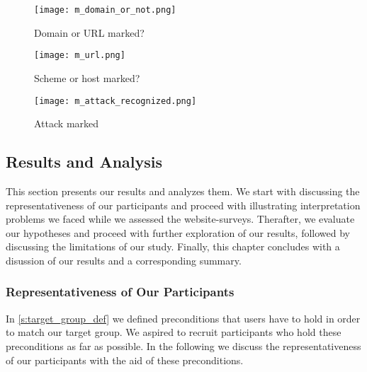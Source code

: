 \begin{figure}[H]
\centering
\texttt{[image: m\_domain\_or\_not.png]}
\caption{Domain or URL marked?}
\label{fig:m_domain_or_not}
\end{figure}

\begin{figure}[H]
\centering
\texttt{[image: m\_url.png]}
\caption{Scheme or host marked?}
\label{fig:m_url}
\end{figure}

\begin{figure}[H]
\centering
\texttt{[image: m\_attack\_recognized.png]}
\caption{Attack marked}
\label{fig:m_attack_recognized}
\end{figure}

\subsection{Results and Analysis}
This section presents our results and analyzes them. 
We start with discussing the representativeness of our participants and proceed with illustrating interpretation problems we faced while we assessed the website-surveys.
Therafter, we evaluate our hypotheses and proceed with further exploration of our results, followed by discussing the limitations of our study.
Finally, this chapter concludes with a disussion of our results and a corresponding summary. 
\subsubsection{Representativeness of Our Participants}
\label{s:representativeness}
In \autoref{s:target_group_def} we defined preconditions that users have to hold in order to match our target group.
We aspired to recruit participants who hold these preconditions as far as possible.
In the following we discuss the representativeness of our participants with the aid of these preconditions.

